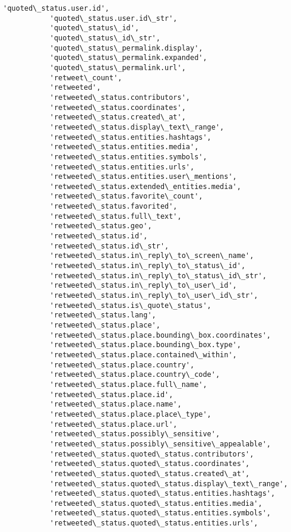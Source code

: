 \documentclass[11pt]{article}
\begin{document}
\begin{Verbatim}[commandchars=\\\{\}]
           'quoted\_status.user.id',
           'quoted\_status.user.id\_str',
           'quoted\_status\_id',
           'quoted\_status\_id\_str',
           'quoted\_status\_permalink.display',
           'quoted\_status\_permalink.expanded',
           'quoted\_status\_permalink.url',
           'retweet\_count',
           'retweeted',
           'retweeted\_status.contributors',
           'retweeted\_status.coordinates',
           'retweeted\_status.created\_at',
           'retweeted\_status.display\_text\_range',
           'retweeted\_status.entities.hashtags',
           'retweeted\_status.entities.media',
           'retweeted\_status.entities.symbols',
           'retweeted\_status.entities.urls',
           'retweeted\_status.entities.user\_mentions',
           'retweeted\_status.extended\_entities.media',
           'retweeted\_status.favorite\_count',
           'retweeted\_status.favorited',
           'retweeted\_status.full\_text',
           'retweeted\_status.geo',
           'retweeted\_status.id',
           'retweeted\_status.id\_str',
           'retweeted\_status.in\_reply\_to\_screen\_name',
           'retweeted\_status.in\_reply\_to\_status\_id',
           'retweeted\_status.in\_reply\_to\_status\_id\_str',
           'retweeted\_status.in\_reply\_to\_user\_id',
           'retweeted\_status.in\_reply\_to\_user\_id\_str',
           'retweeted\_status.is\_quote\_status',
           'retweeted\_status.lang',
           'retweeted\_status.place',
           'retweeted\_status.place.bounding\_box.coordinates',
           'retweeted\_status.place.bounding\_box.type',
           'retweeted\_status.place.contained\_within',
           'retweeted\_status.place.country',
           'retweeted\_status.place.country\_code',
           'retweeted\_status.place.full\_name',
           'retweeted\_status.place.id',
           'retweeted\_status.place.name',
           'retweeted\_status.place.place\_type',
           'retweeted\_status.place.url',
           'retweeted\_status.possibly\_sensitive',
           'retweeted\_status.possibly\_sensitive\_appealable',
           'retweeted\_status.quoted\_status.contributors',
           'retweeted\_status.quoted\_status.coordinates',
           'retweeted\_status.quoted\_status.created\_at',
           'retweeted\_status.quoted\_status.display\_text\_range',
           'retweeted\_status.quoted\_status.entities.hashtags',
           'retweeted\_status.quoted\_status.entities.media',
           'retweeted\_status.quoted\_status.entities.symbols',
           'retweeted\_status.quoted\_status.entities.urls',

\end{Verbatim}
\end{document}
